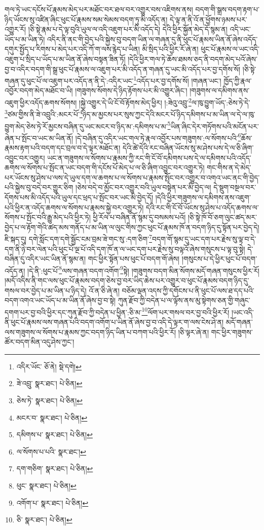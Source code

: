 གལ་ཏེ་ཡང་དངོས་པོ་རྣམས་མེད་པར་མཐོང་བར་ཐལ་བར་འགྱུར་བས་འཇིགས་ནས། བདག་གི་སྒྲས་བདག་རྟག་པ་ཉིད་ཡོངས་སུ་འཛིན་ཞིང་ཕུང་པོ་རྣམས་སམ་སེམས་བདག་ཏུ་མི་འདོད་ན། དེ་ལྟ་ན་ནི་འོ་ན་ཕྱོགས་ཉམས་པར་འགྱུར་རོ། །ཅི་སྟེ་རྣམ་པ་དེ་ལྟ་བུའི་ཡུལ་ལ་འདི་འཇུག་པར་མི་འདོད་དེ། དེའི་ཕྱིར་སྐྱོན་མེད་དོ་སྙམ་ན། འདི་ཡང་ཡོད་པ་མ་ཡིན་ཏེ། འདིར་ནི་ནང་གི་བྱེད་པའི་སྐྱེས་བུ་བདག་ཡིན་ལ་གཞན་དུ་ནི་ཕུང་པོ་རྣམས་ཡིན་ནོ་ཞེས་འདོད་དགུར་སྤྱོད་པ་རིགས་པ་མེད་པར་འདི་ཀོ་ག་ལས་རྙེད་པ་ཡིན། མི་སྲིད་པའི་ཕྱིར་རོ་ཞེ་ན། ཕུང་པོ་རྣམས་ལ་ཡང་འདི་འཇུག་པ་སྲིད་པ་ཡོད་པ་མ་ཡིན་ནོ་ཞེས་བསྟན་ཟིན་ཏོ། །དེའི་ཕྱིར་གལ་ཏེ་ཆོས་ཐམས་ཅད་ནི་བདག་མེད་པའོ་ཞེས་བྱ་བ་འདིར་བདག་གི་སྒྲ་ཕུང་པོ་རྣམས་ལ་འཇུག་པར་མི་འདོད་ན་གཞན་དུ་ཡང་མི་འདོད་པར་བྱ་དགོས་སོ། །ཅི་སྟེ་གཞན་དུ་ཕུང་པོ་ལ་འཇུག་པར་འདོད་ན་ནི་དེ་:འདིར་ཡང་\footnote{འདིར་ཡོང་  ཅོ་ནེ།  སྡེ་དགེ། }འདོད་པར་བྱ་དགོས་སོ། །གཞན་ཡང་། ཁྱོད་ཀྱི་རྣལ་འབྱོར་བདག་མེད་མཐོང་བ་ཡི། །གཟུགས་སོགས་དེ་ཉིད་རྟོགས་པར་མི་འགྱུར་ཞིང་། །གཟུགས་ལ་དམིགས་ནས་འཇུག་ཕྱིར་འདོད་ཆགས་སོགས། །སྐྱེ་འགྱུར་དེ་ཡི་ངོ་བོ་རྟོགས་མེད་ཕྱིར། །:ཟེའུ་འབྲུ་\footnote{ཟེ་འབྲུ་  སྣར་ཐང་།  པེ་ཅིན། }ལ་ཁུ་བྱུག་ཡོད་:ཅེས་ཏེ་དེ་\footnote{ཅེས་ཏེ་  སྣར་ཐང་།  པེ་ཅིན། }ཙམ་གྱིས་ནི་ཟེ་འབྲུའི་:མངར་པོ་\footnote{མངར་བ་  སྣར་ཐང་།  པེ་ཅིན། }ཉིད་མ་མྱངས་པར་སུས་ཀྱང་དེའི་མངར་པོ་ཉིད་དམིགས་པ་མ་ཡིན་ལ་དེ་ལ་ཁུ་བྱུག་མེད་ཅེས་ཏེ་རོ་མྱངས་བཞིན་དུ་ཡང་མངར་བ་ཉིད་མ་:དམིགས་པ་མ་\footnote{དམིགས་པ་  སྣར་ཐང་།  པེ་ཅིན། }ཡིན་ཞིང་དེར་གཏོགས་པའི་མངོན་པར་ཞེན་པ་སྤོང་བ་ཡང་མ་ཡིན་ནོ། །དེ་བཞིན་དུ་འདིར་ཡང་གལ་ཏེ་རྣལ་འབྱོར་པས་གཟུགས་:ལ་སོགས་པའི་\footnote{ལ་སོགས་པ་པའི་  སྣར་ཐང་། }ཆོས་རྣམས་རྟག་པའི་བདག་དང་བྲལ་བ་དེ་ལྟར་མཐོང་ན། དེའི་ཚེ་དེའི་རང་བཞིན་ཡོངས་སུ་མ་ཤེས་པས་དེ་ལ་ཅི་ཞིག་འབྱུང་བར་འགྱུར། ཡང་ན་གཟུགས་ལ་སོགས་པ་རྣམས་ཀྱི་རང་གི་ངོ་བོ་དམིགས་པས་དེ་ལ་དམིགས་པའི་འདོད་ཆགས་ལ་སོགས་པ་སྤོང་ན་ཡང་བདག་གི་དངོས་པོ་མེད་པ་ལ་ཅི་ཞིག་འབྱུང་བར་འགྱུར་ཏེ། གང་གིས་ན་དེ་མེད་པར་ཡོངས་སུ་ཤེས་པ་ལས་དེ་ཡུལ་དག་ལ་ཆགས་པ་ལ་སོགས་པ་རྣམས་སྤོང་བར་འགྱུར་བ་འགའ་ཡང་ནང་གི་བྱེད་པའི་སྐྱེས་བུ་བདེ་བར་གྱུར་ཅིག །ཅེས་བདེ་བ་མྱོང་བར་འགྱུར་བའི་ཡུལ་བསྟེན་པར་མི་བྱེད་ལ། དེ་སྡུག་བསྔལ་བར་དོགས་པས་མི་འདོད་པའི་ཡུལ་དང་ཕྲད་པ་སྤོང་བར་ཡང་མི་བྱེད་དོ། །དེའི་ཕྱིར་གཟུགས་ལ་དམིགས་ནས་འཇུག་པའི་ཕྱིར་ན་འདོད་ཆགས་ལ་སོགས་པ་རྣམས་སྐྱེ་བར་འགྱུར་ཏེ། དེའི་རང་གི་ངོ་བོ་ཡོངས་སུ་ཤེས་པ་འདོད་ཆགས་ལ་སོགས་པ་སྤོང་བའི་རྒྱུ་མེད་པའི་ཕྱིར་ཏེ། ཕྱི་རོལ་པ་བཞིན་ནོ་སྙམ་དུ་བསམས་པའོ། །ཅི་སྟེ་ཁོ་བོ་ཅག་ལུང་ཚད་མར་བྱེད་པ་ལ་རྟོག་གེའི་ཚད་མས་གནོད་པ་མ་ཡིན་ལ་ལུང་གིས་ཀྱང་ཕུང་པོ་རྣམས་ཁོ་ན་བདག་ཉིད་དུ་སྟོན་པར་བྱེད་དེ། ཇི་སྐད་དུ། དགེ་སློང་དག་དགེ་སྦྱོང་ངམ་བྲམ་ཟེ་གང་སུ་:དག་ཅིག་\footnote{དག་གཅིག་  སྣར་ཐང་།  པེ་ཅིན། }བདག་གོ་སྙམ་དུ་ཡང་དག་པར་རྗེས་སུ་ལྟ་བ་དེ་དག་ནི་ཉེ་བར་ལེན་པའི་ཕུང་པོ་ལྔ་པོ་འདི་དག་ཁོ་ན་ལ་ཡང་དག་པར་རྗེས་སུ་བལྟའོ་ཞེས་གསུངས་པ་ལྟ་བུ་སྟེ། དེ་བཞིན་དུ་འདིར་ཡང་ཡིན་ནོ་སྙམ་ན། གང་ཕྱིར་སྟོན་པས་ཕུང་པོ་བདག་གོ་ཞེས། །གསུངས་པ་དེ་ཕྱིར་ཕུང་པོ་བདག་འདོད་ན། །དེ་ནི་:ཕུང་པོ་\footnote{ཕུང་  སྣར་ཐང་།  པེ་ཅིན། }ལས་གཞན་བདག་འགོག་\footnote{འགོག་པ་  སྣར་ཐང་།  པེ་ཅིན། }སྟེ། །གཟུགས་བདག་མིན་སོགས་མདོ་གཞན་གསུངས་ཕྱིར་རོ། །མདོ་འདིས་ནི་གང་ལས་ཕུང་པོ་རྣམས་བདག་ཅེས་བྱ་བར་ཡིད་ཆེས་པར་འགྱུར་བ་ཕུང་པོ་རྣམས་བདག་ཉིད་དུ་གསལ་བར་བྱེད་པ་མ་ཡིན་པ་ཉིད་དེ། འོ་ན་ཅི་ཞེ་ན། བཅོམ་ལྡན་འདས་ཀྱི་དགོངས་པ་ནི་ཕུང་པོ་ལས་ཐ་དད་པའི་བདག་འགའ་ཡང་ཡོད་པ་མ་ཡིན་ནོ་ཞེས་བྱ་བ་སྟེ། ཀུན་རྫོབ་ཀྱི་བདེན་པ་ལ་ལྟོས་ནས་མུ་སྟེགས་ཅན་གྱི་གཞུང་དགག་པར་བྱ་བའི་ཕྱིར་དང་ཀུན་རྫོབ་ཀྱི་བདེན་པ་ཕྱིན་:ཅི་མ་\footnote{ཅི་  སྣར་ཐང་།  པེ་ཅིན། }ལོག་པར་གསལ་བར་བྱ་བའི་ཕྱིར་རོ། །ཡང་འདི་ནི་ཕུང་པོ་རྣམས་ལས་གཞན་པའི་བདག་འགོག་པ་ཡིན་ནོ་ཞེས་བྱ་བ་འདི་དེ་ལྟར་ག་ལས་ངེས་ཤེ་ན། མདོ་གཞན་ལས་གཟུགས་ལ་སོགས་པ་རྣམས་ཀྱང་བདག་ཉིད་ཡིན་པ་བཀག་པའི་ཕྱིར་རོ། །ཅི་ལྟར་ཞེ་ན། གང་ཕྱིར་གཟུགས་ཚོར་བདག་མིན་འདུ་ཤེས་ཀྱང་། 